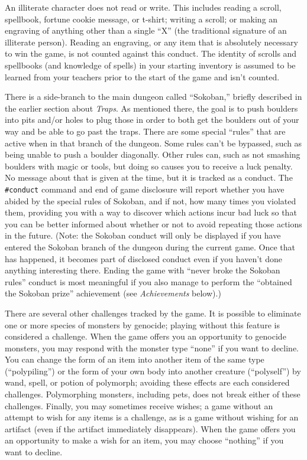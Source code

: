 An illiterate character does not read or write.  This includes reading
a scroll, spellbook, fortune cookie message, or t-shirt; writing a
scroll; or making an engraving of anything other than a single ``X'' (the
traditional signature of an illiterate person).  Reading an engraving,
or any item that is absolutely necessary to win the game, is not counted
against this conduct.  The identity of scrolls and spellbooks (and
knowledge of spells) in your starting inventory is assumed to be
learned from your teachers prior to the start of the game and isn't
counted.

There is a side-branch to the main dungeon called ``Sokoban,'' briefly
described in the earlier section about {\it Traps}.
As mentioned there, the goal is to push boulders into pits and/or holes
to plug those in order to both get the boulders out of your way and be
able to go past the traps.
There are some special ``rules'' that are active when in that branch
of the dungeon.
Some rules can't be bypassed, such as being unable to push a boulder
diagonally.
Other rules can, such as not smashing boulders with magic or tools,
but doing so causes you to receive a luck penalty.
No message about that is given at the time, but it is tracked as a conduct.
The {\tt \#conduct} command and end of game disclosure will report whether
you have abided by the special rules of Sokoban, and if not, how many
times you violated them, providing you with a way to discover which
actions incur bad luck so that you can be better informed about whether
or not to avoid repeating those actions in the future.
(Note:  the Sokoban conduct will only be displayed if you have
entered the Sokoban branch of the dungeon during the current game.
Once that has happened, it becomes part of disclosed conduct even if
you haven't done anything interesting there.
Ending the game with ``never broke the Sokoban rules'' conduct is most
meaningful if you also manage to perform
the ``obtained the Sokoban prize'' achievement
(see {\it Achievements\/} below).)

There are several other challenges tracked by the game.  It is possible
to eliminate one or more species of monsters by genocide; playing without
this feature is considered a challenge.  When the game offers you an
opportunity to genocide monsters, you may respond with the monster type
``none'' if you want to decline.  You can change the form of an item into
another item of the same type (``polypiling'') or the form of your own
body into another creature (``polyself'') by wand, spell, or potion of
polymorph; avoiding these effects are each considered challenges.
Polymorphing monsters, including pets, does not break either of these
challenges.
Finally, you may sometimes receive wishes; a game without an attempt to
wish for any items is a challenge, as is a game without wishing for
an artifact (even if the artifact immediately disappears).  When the
game offers you an opportunity to make a wish for an item, you may
choose ``nothing'' if you want to decline.


